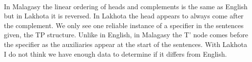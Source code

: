 \documentclass[20pt]{article}
\newcommand{\feature}[1]{\ensuremath{\left[ \text{#1} \right]}}
\newcommand{\treeScale}[0]{0.9}
\begin{document}
 \\

In Malagasy the linear ordering of heads and complements is the same as English
but in Lakhota it is reversed. In Lakhota the head appears to always come after
the complement. We only see one reliable instance of a specifier in the
sentences given, the TP structure. Unlike in English, in Malagasy the T' node
comes before the specifier as the auxiliaries appear at the start of the
sentences. With Lakhota I do not think we have enough data to determine if it
differs from English.
\end{document}
